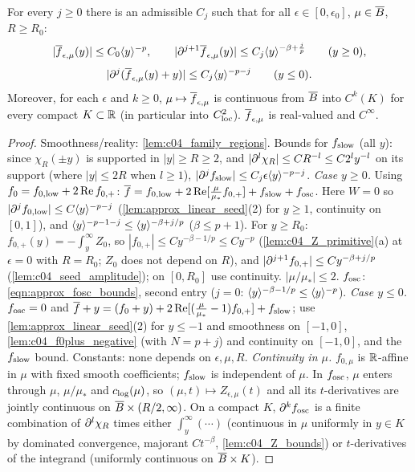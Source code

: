\begin{proposition}
  \label{prop:approx_profile_bounds}
  For every $j\ge0$ there is an admissible $C_j$ such that for all $\epsilon\in[0,\epsilon_0]$, $\mu\in\overline{B}$, $R\ge R_0$:
  \[
    |\overline{f}_{\epsilon,\mu}(y)|\le C_0\langle y \rangle^{-p},\qquad|\partial^{j+1}\overline{f}_{\epsilon,\mu}(y)|\le C_j\langle y \rangle^{-\beta+\frac jp}\qquad(y\ge0),
  \]
  \[
    |\partial^j(\overline{f}_{\epsilon,\mu}(y)+y)|\le C_j\langle y \rangle^{-p-j}\qquad(y\le0).
  \]
  Moreover, for each $\epsilon$ and $k\ge0$, $\mu\mapsto\overline{f}_{\epsilon,\mu}$ is continuous from $\overline{B}$ into $C^k(K)$ for every compact $K\subset\mathbb{R}$
  (in particular into $C^2_{\textup{loc}}$). $\overline{f}_{\epsilon,\mu}$ is real-valued and $C^\infty$.
\end{proposition}
\begin{proof}
  Smoothness/reality: \cref{lem:c04_family_regions}. Bounds for $f_{\textup{slow}}$ (all $y$): since $\chi_R(\pm y)$ is supported in $|y|\ge R\ge2$,
  and $|\partial^l\chi_R|\le CR^{-l}\le C2^ly^{-l}$ on its support (where $|y|\le2R$ when $l\ge1$), $|\partial^jf_{\textup{slow}}|\le C_j\epsilon\langle y \rangle^{-p-j}$.
  \emph{Case $y\ge0$.} Using $f_0=f_{0,\textup{low}}+2\operatorname{Re}f_{0,+}$:
  $\overline{f}=f_{0,\textup{low}}+2\operatorname{Re}[\frac\mu{\mu_*}f_{0,+}]+f_{\textup{slow}}+f_{\textup{osc}}$. Here $W=0$ so
  $|\partial^jf_{0,\textup{low}}|\le C\langle y \rangle^{-p-j}$ (\cref{lem:approx_linear_seed}(2) for $y\ge1$, continuity on $[0,1]$), and $\langle y \rangle^{-p-1-j}\le\langle y \rangle^{-\beta+j/p}$
  ($\beta\le p+1$). For $y\ge R_0$: $f_{0,+}(y)=-\int_y^\infty Z_0$, so $|f_{0,+}|\le Cy^{-\beta-1/p}\le Cy^{-p}$ (\cref{lem:c04_Z_primitive}(a) at
  $\epsilon=0$ with $R=R_0$; $Z_0$ does not depend on $R$), and $|\partial^{j+1}f_{0,+}|\le Cy^{-\beta+j/p}$ (\cref{lem:c04_seed_amplitude}); on $[0,R_0]$
  use continuity. $|\mu/\mu_*|\le2$. $f_{\textup{osc}}$: \eqref{eqn:approx_fosc_bounds}, second entry ($j=0$: $\langle y \rangle^{-\beta-1/p}\le\langle y \rangle^{-p}$).
  \emph{Case $y\le0$.} $f_{\textup{osc}}=0$ and $\overline{f}+y=(f_0+y)+2\operatorname{Re}[(\frac\mu{\mu_*}-1)f_{0,+}]+f_{\textup{slow}}$; use
  \cref{lem:approx_linear_seed}(2) for $y\le-1$ and smoothness on $[-1,0]$, \cref{lem:c04_f0plus_negative} (with $N=p+j$) and continuity on $[-1,0]$,
  and the $f_{\textup{slow}}$ bound. Constants: none depends on $\epsilon,\mu,R$.
  \emph{Continuity in $\mu$.} $f_{0,\mu}$ is $\mathbb{R}$-affine in $\mu$ with fixed smooth coefficients; $f_{\textup{slow}}$ is independent of $\mu$. In
  $f_{\textup{osc}}$, $\mu$ enters through $\mu$, $\mu/\mu_*$ and $c_{\textup{log}}(\mu)$, so $(\mu,t)\mapsto Z_{\epsilon,\mu}(t)$ and all its $t$-derivatives are
  jointly continuous on $\overline{B}\times(R/2,\infty)$. On a compact $K$, $\partial^kf_{\textup{osc}}$ is a finite combination of $\partial^l\chi_R$ times either
  $\int_y^\infty(\cdots)$ (continuous in $\mu$ uniformly in $y\in K$ by dominated convergence, majorant $Ct^{-\beta}$, \cref{lem:c04_Z_bounds}) or
  $t$-derivatives of the integrand (uniformly continuous on $\overline{B}\times K$).
\end{proof}

